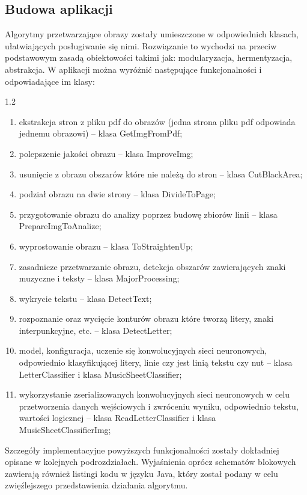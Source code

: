 \documentclass[a4paper,12pt]{article}
\newcommand\spacingInSolemnItemize{1.2}
\newcommand\spacingIndent{2.2em}
\newcommand\spacingVspace{0.7em}
\begin{document}
	\subsection{Budowa aplikacji}
		\hspace{\spacingIndent} Algorytmy  przetwarzające obrazy zostały umieszczone w odpowiednich klasach, ułatwiających posługiwanie się nimi. Rozwiązanie to wychodzi na przeciw podstawowym zasadą obiektowości takimi jak: modularyzacja, hermentyzacja, abstrakcja. W aplikacji można wyróżnić następujące funkcjonalności i odpowiadające im klasy:
		\begin{spacing}{\spacingInSolemnItemize}
    		\begin{enumerate}
    			\item ekstrakcja stron z pliku pdf do obrazów (jedna strona pliku pdf odpowiada jednemu obrazowi) -- klasa GetImgFromPdf;
    			\item polepszenie jakości obrazu -- klasa ImproveImg;
    			\item usunięcie z obrazu obszarów które nie należą do stron -- klasa CutBlackArea;
    			\item podział obrazu na dwie strony -- klasa DivideToPage;
    			\item przygotowanie obrazu do analizy poprzez budowę zbiorów linii -- klasa PrepareImgToAnalize;
    			\item wyprostowanie obrazu -- klasa ToStraightenUp;
    			\item zasadnicze przetwarzanie obrazu, detekcja obszarów zawierających znaki muzyczne i teksty -- klasa MajorProcessing; 
    			\item wykrycie tekstu -- klasa DetectText;
    			\item rozpoznanie oraz wycięcie konturów obrazu które tworzą litery, znaki interpunkcyjne, etc. -- klasa DetectLetter;
    			\item  model, konfiguracja, uczenie się konwolucyjnych sieci neuronowych, odpowiednio klasyfikującej litery, linie czy jest linią tekstu czy nut -- klasa LetterClassifier i klasa MusicSheetClassifier;
    			\item wykorzystanie zserializowanych konwolucyjnych sieci neuronowych w celu przetworzenia danych wejściowych i zwróceniu wyniku, odpowiednio tekstu, wartości logicznej -- klasa ReadLetterClassifier i klasa MusicSheetClassifierImg;
    		\end{enumerate} 
        \end{spacing}
        \vspace{\spacingVspace}
        Szczegóły implementacyjne powyższych funkcjonalności zostały dokładniej opisane w kolejnych podrozdziałach. Wyjaśnienia oprócz schematów blokowych zawierają również listingi kodu w języku Java, który został podany w celu zwięźlejszego przedstawienia działania algorytmu.
\end{document}
